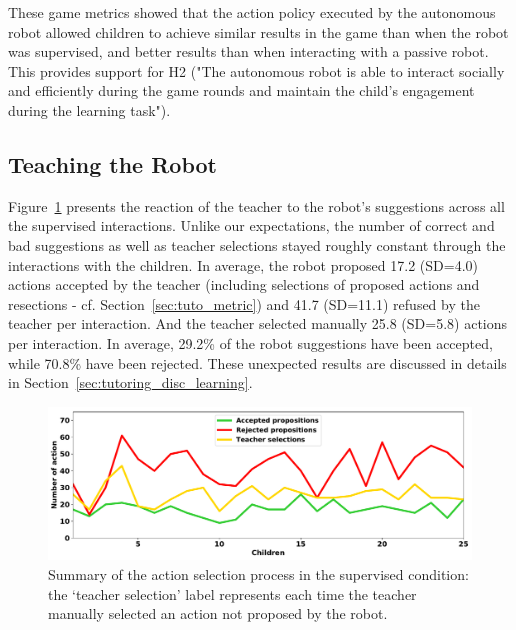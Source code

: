 These game metrics showed that the action policy executed by the autonomous robot allowed children to achieve similar results in the game than when the robot was supervised, and better results than when interacting with a passive robot. This provides support for H2 ("The autonomous robot is able to interact socially and efficiently during the game rounds and maintain the child's engagement during the learning task"). 

\subsection{Teaching the Robot}

Figure~\ref{fig:tutoring_supervision} presents the reaction of the teacher to the robot's suggestions across all the supervised interactions. Unlike our expectations, the number of correct and bad suggestions as well as teacher selections stayed roughly constant through the interactions with the children. In average, the robot proposed 17.2 (SD=4.0) actions accepted by the teacher (including selections of proposed actions and resections - cf. Section~\ref{sec:tuto_metric}) and 41.7 (SD=11.1) refused by the teacher per interaction. And the teacher selected manually 25.8 (SD=5.8) actions per interaction. In average, 29.2\% of the robot suggestions have been accepted, while 70.8\% have been rejected. These unexpected results are discussed in details in Section~\ref{sec:tutoring_disc_learning}.

\begin{figure}[ht]
	\includegraphics[width=1\linewidth]{./summary_supervision.pdf}
	\centering
	\caption{Summary of the action selection process in the supervised condition: the `teacher selection' label represents each time the teacher manually selected an action not proposed by the robot.}
	\label{fig:tutoring_supervision}
\end{figure}


